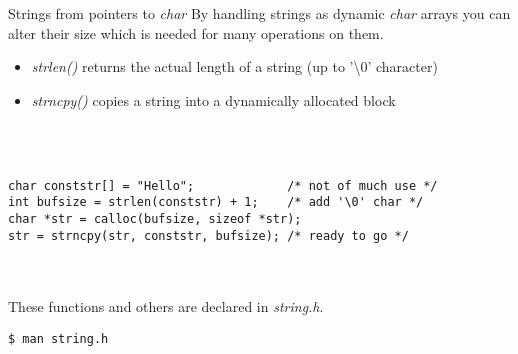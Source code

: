 \begin{frame}[fragile]{Strings from pointers to \textit{char}}
	By handling strings as dynamic \textit{char} arrays you can alter their size which is needed for many operations on them.
	\begin{itemize}
		\item \textit{strlen()} returns the actual length of a string (up to '\textbackslash 0' character)
		\item \textit{strncpy()} copies a string into a dynamically allocated block
	\end{itemize}\ \\
	\ \\
	\begin{lstlisting}[numbers=none]
char conststr[] = "Hello";			   /* not of much use */
int bufsize = strlen(conststr) + 1;	   /* add '\0' char */
char *str = calloc(bufsize, sizeof *str);
str = strncpy(str, conststr, bufsize); /* ready to go */
\end{lstlisting}\ \\
	\ \\
	These functions and others are declared in \textit{string.h}.
	\begin{lstlisting}[numbers=none]
$ man string.h
\end{lstlisting}
\end{frame}


